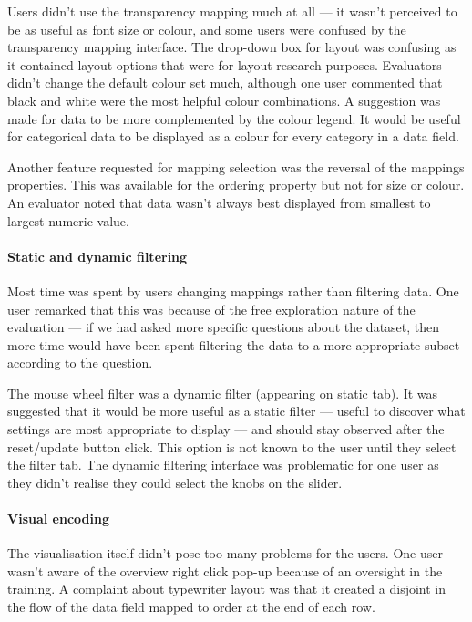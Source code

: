 Users didn't use the transparency mapping much at all --- it wasn't perceived to be as useful as font size or colour, and some users were confused by the transparency mapping interface. The drop-down box for layout was confusing as it contained layout options that were for layout research purposes. Evaluators didn't change the default colour set much, although one user commented that black and white were the most helpful colour combinations. A suggestion was made for data to be more complemented by the colour legend. It would be useful for categorical data to be displayed as a colour for every category in a data field.

Another feature requested for mapping selection was the reversal of the mappings properties. This was available for the ordering property but not for size or colour. An evaluator noted that data wasn't always best displayed from smallest to largest numeric value.

\paragraph{Static and dynamic filtering}

Most time was spent by users changing mappings rather than filtering data. One user remarked that this was because of the free exploration nature of the evaluation --- if we had asked more specific questions about the dataset, then more time would have been spent filtering the data to a more appropriate subset according to the question.

The mouse wheel filter was a dynamic filter (appearing on static tab). It was suggested that it would be more useful as a static filter --- useful to discover what settings are most appropriate to display --- and should stay observed after the reset/update button click. This option is not known to the user until they select the filter tab. The dynamic filtering interface was problematic for one user as they didn't realise they could select the knobs on the slider.

\paragraph{Visual encoding}

The visualisation itself didn't pose too many problems for the users. One user wasn't aware of the overview right click pop-up because of an oversight in the training. A complaint about typewriter layout was that it created a disjoint in the flow of the data field mapped to order at the end of each row.

